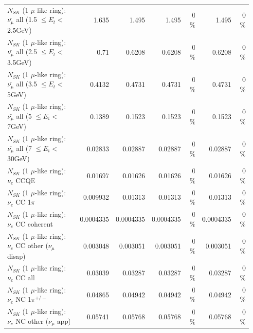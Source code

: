 \begin{table}
\begin{tabular}{| l | r | r | r  r | r  r |}
 $N_{SK}$ (1 $\mu$-like ring): $\bar{\nu_{\mu}}$ all (1.5 $\leq E_{t} <$ 2.5GeV) &           1.635 &           1.495 &           1.495 &        0 \%  &           1.495 &        0 \%  \\ 
 $N_{SK}$ (1 $\mu$-like ring): $\bar{\nu_{\mu}}$ all (2.5 $\leq E_{t} <$ 3.5GeV) &            0.71 &          0.6208 &          0.6208 &        0 \%  &          0.6208 &        0 \%  \\ 
   $N_{SK}$ (1 $\mu$-like ring): $\bar{\nu_{\mu}}$ all (3.5 $\leq E_{t} <$ 5GeV) &          0.4132 &          0.4731 &          0.4731 &        0 \%  &          0.4731 &        0 \%  \\ 
     $N_{SK}$ (1 $\mu$-like ring): $\bar{\nu_{\mu}}$ all (5 $\leq E_{t} <$ 7GeV) &          0.1389 &          0.1523 &          0.1523 &        0 \%  &          0.1523 &        0 \%  \\ 
    $N_{SK}$ (1 $\mu$-like ring): $\bar{\nu_{\mu}}$ all (7 $\leq E_{t} <$ 30GeV) &         0.02833 &         0.02887 &         0.02887 &        0 \%  &         0.02887 &        0 \%  \\ 
\hline
\hline
\hline
                                      $N_{SK}$ (1 $\mu$-like ring): $\nu_e$ CCQE &         0.01697 &         0.01626 &         0.01626 &        0 \%  &         0.01626 &        0 \%  \\ 
                                 $N_{SK}$ (1 $\mu$-like ring): $\nu_e$ CC 1$\pi$ &        0.009932 &         0.01313 &         0.01313 &        0 \%  &         0.01313 &        0 \%  \\ 
                               $N_{SK}$ (1 $\mu$-like ring): $\nu_e$ CC coherent &       0.0004335 &       0.0004335 &       0.0004335 &        0 \%  &       0.0004335 &        0 \%  \\ 
                $N_{SK}$ (1 $\mu$-like ring): $\nu_e$ CC other ($\nu_\mu$ disap) &        0.003048 &        0.003051 &        0.003051 &        0 \%  &        0.003051 &        0 \%  \\ 
                                  $N_{SK}$ (1 $\mu$-like ring): $\nu_{e}$ CC all &         0.03039 &         0.03287 &         0.03287 &        0 \%  &         0.03287 &        0 \%  \\ 
\hline
                           $N_{SK}$ (1 $\mu$-like ring): $\nu_e$ NC 1$\pi^{+/-}$ &         0.04865 &         0.04942 &         0.04942 &        0 \%  &         0.04942 &        0 \%  \\ 
                  $N_{SK}$ (1 $\mu$-like ring): $\nu_e$ NC other ($\nu_\mu$ app) &         0.05741 &         0.05768 &         0.05768 &        0 \%  &         0.05768 &        0 \%  \\ 

\end{tabular}
\end{table}
